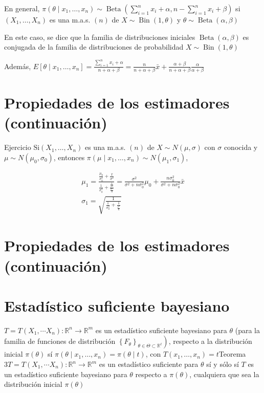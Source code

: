 En general, $\pi\left(\theta \mid x_{1}, \ldots, x_{n}\right) \sim \operatorname{Beta}\left(\sum_{i=1}^{n} x_{i}+\alpha, n-\sum_{i=1}^{n} x_{i}+\beta\right)$ si $\left(X_{1}, \ldots, X_{n}\right)$ es una m.a.s. $(n)$ de $X \sim \operatorname{Bin}(1, \theta)$ y $\theta \sim \operatorname{Beta}(\alpha, \beta)$

En este caso, se dice que la familia de distribuciones iniciales $\operatorname{Beta}(\alpha, \beta)$ es conjugada de la familia de distribuciones de probabilidad $X \sim \operatorname{Bin}(1, \theta)$

Además, $E\left[\theta \mid x_{1}, \ldots, x_{n}\right]=\frac{\sum_{i=1}^{n} x_{i}+\alpha}{n+\alpha+\beta}=\frac{n}{n+\alpha+\beta} \bar{x}+\frac{\alpha+\beta}{n+\alpha+\beta} \frac{\alpha}{\alpha+\beta}$

\section*{Propiedades de los estimadores (continuación)}
Ejercicio $\mathrm{Si}\left(X_{1}, \ldots, X_{n}\right)$ es una m.a.s. $(n)$ de $X \sim N(\mu, \sigma)$ con $\sigma$ conocida y $\mu \sim N\left(\mu_{0}, \sigma_{0}\right)$, entonces $\pi\left(\mu \mid x_{1}, \ldots, x_{n}\right) \sim N\left(\mu_{1}, \sigma_{1}\right)$,

$$
\begin{gathered}
\mu_{1}=\frac{\frac{\mu_{0}}{\sigma_{0}^{2}}+\frac{\bar{x}}{\sigma^{2}}}{\frac{1}{\sigma_{0}^{2}}+\frac{\frac{1}{\sigma^{2}}}{\frac{\sigma^{n}}{n}}}=\frac{\sigma^{2}}{\sigma^{2}+n \sigma_{0}^{2}} \mu_{0}+\frac{n \sigma_{0}^{2}}{\sigma^{2}+n \sigma_{0}^{2}} \bar{x} \\
\sigma_{1}=\sqrt{\frac{1}{\frac{1}{\sigma_{0}^{2}}+\frac{1}{\frac{\sigma^{2}}{n}}}}
\end{gathered}
$$

\section*{Propiedades de los estimadores (continuación)}
\section*{Estadístico suficiente bayesiano}
 $T=T\left(X_{1}, \cdots X_{n}\right): \mathbb{R}^{n} \longrightarrow \mathbb{R}^{m}$ es un estadístico suficiente bayesiano para $\theta$ (para la familia de funciones de distribución $\left.\left\{F_{\theta}\right\}_{\theta \in \Theta \subset \mathbb{R}^{\ell}}\right)$, respecto a la distribución inicial $\pi(\theta)$ sí $\pi\left(\theta \mid x_{1}, \ldots, x_{n}\right)=\pi(\theta \mid t)$, con $T\left(x_{1}, \ldots, x_{n}\right)=t$Teorema $3 T=T\left(X_{1}, \cdots X_{n}\right): \mathbb{R}^{n} \longrightarrow \mathbb{R}^{m}$ es un estadístico suficiente para $\theta$ sí y sólo sí $T$ es un estadístico suficiente bayesiano para $\theta$ respecto a $\pi(\theta)$, cualquiera que sea la distribución inicial $\pi(\theta)$


